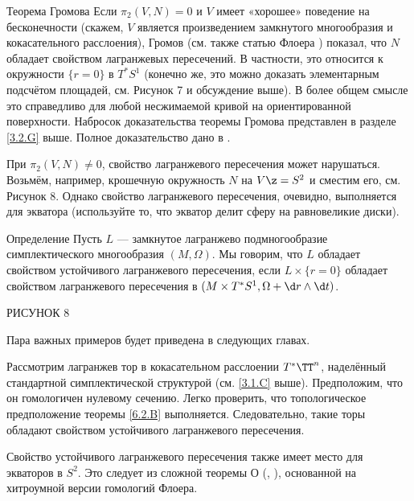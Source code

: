 \begin{thm}{Теорема Громова}\label{6.2.B} 
Если $\pi_2 (V, N) = 0$ и $V$ имеет «хорошее» поведение на бесконечности (скажем, $V$ является произведением замкнутого многообразия и кокасательного расслоения), Громов \cite{G1} (см. также статью Флоера \cite{F}) показал, что $N$ обладает свойством лагранжевых пересечений.
В частности, это относится к окружности $\{r = 0\}$ в $T^\ast S^1$ (конечно же, это можно доказать элементарным подсчётом площадей, см. Рисунок 7 и обсуждение выше).
В более общем смысле это справедливо для любой несжимаемой кривой на ориентированной поверхности.
Набросок доказательства теоремы Громова представлен в разделе \ref{3.2.G} выше.
Полное доказательство дано в \cite[Chap. X]{AL}.

При $\pi_2 (V, N) \ne 0$, свойство лагранжевого пересечения может нарушаться.
Возьмём, например, крошечную окружность $N$ на $V \z= S^2$ и сместим его, см. Рисунок 8.
Однако свойство лагранжевого пересечения, очевидно, выполняется для экватора (используйте то, что экватор делит сферу на равновеликие диски).
\end{thm}




\begin{thm}{Определение}\label{6.2.C}
Пусть $L$ --- замкнутое лагранжево подмногообразие симплектического многообразия $(M, \Omega)$.
Мы говорим, что $L$ обладает свойством устойчивого лагранжевого пересечения, если $L \times \{r = 0\}$ обладает свойством лагранжевого пересечения в $(M \times T^\ast S^1, \Omega + \d r \wedge \d t)$.
\end{thm}




РИСУНОК 8 

Пара важных примеров будет приведена в следующих главах.

\begin{thm}{}\label{6.2.D}
Рассмотрим лагранжев тор в кокасательном расслоении $T^\ast \TT^n$, наделённый стандартной симплектической структурой (см. \ref{3.1.C} выше).
Предположим, что он гомологичен нулевому сечению.
Легко проверить, что топологическое предположение теоремы \ref{6.2.B} выполняется.
Следовательно, такие торы обладают свойством устойчивого лагранжевого пересечения.
\end{thm}




\begin{thm}[Экватор на $S^2$.]{}\label{6.2.E}
Свойство устойчивого лагранжевого пересечения также имеет место для экваторов в $S^2$.
Это следует из сложной теоремы О (\cite{O1}, \cite{O2}), основанной на хитроумной версии гомологий Флоера.
\end{thm}


